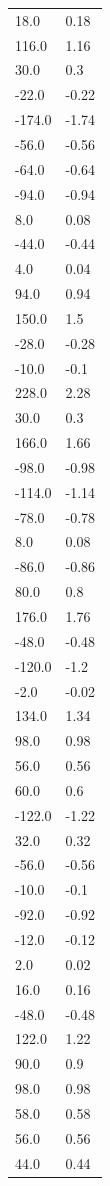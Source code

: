 \begin{longtable}{ll}
18.0 & 0.18 \\
116.0 & 1.16 \\
30.0 & 0.3 \\
-22.0 & -0.22 \\
-174.0 & -1.74 \\
-56.0 & -0.56 \\
-64.0 & -0.64 \\
-94.0 & -0.94 \\
8.0 & 0.08 \\
-44.0 & -0.44 \\
4.0 & 0.04 \\
94.0 & 0.94 \\
150.0 & 1.5 \\
-28.0 & -0.28 \\
-10.0 & -0.1 \\
228.0 & 2.28 \\
30.0 & 0.3 \\
166.0 & 1.66 \\
-98.0 & -0.98 \\
-114.0 & -1.14 \\
-78.0 & -0.78 \\
8.0 & 0.08 \\
-86.0 & -0.86 \\
80.0 & 0.8 \\
176.0 & 1.76 \\
-48.0 & -0.48 \\
-120.0 & -1.2 \\
-2.0 & -0.02 \\
134.0 & 1.34 \\
98.0 & 0.98 \\
56.0 & 0.56 \\
60.0 & 0.6 \\
-122.0 & -1.22 \\
32.0 & 0.32 \\
-56.0 & -0.56 \\
-10.0 & -0.1 \\
-92.0 & -0.92 \\
-12.0 & -0.12 \\
2.0 & 0.02 \\
16.0 & 0.16 \\
-48.0 & -0.48 \\
122.0 & 1.22 \\
90.0 & 0.9 \\
98.0 & 0.98 \\
58.0 & 0.58 \\
56.0 & 0.56 \\
44.0 & 0.44 \\

\end{longtable}
